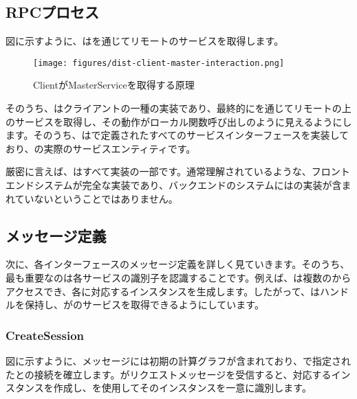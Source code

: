 \begin{content}
\subsection{RPCプロセス}

図に示すように、はを通じてリモートのサービスを取得します。

\begin{figure}[H]
\centering
\texttt{[image: figures/dist-client-master-interaction.png]}
\caption{ClientがMasterServiceを取得する原理}
 \label{fig:dist-client-master-interaction}
\end{figure}

そのうち、はクライアントの一種の実装であり、最終的にを通じてリモートの上のサービスを取得し、その動作がローカル関数呼び出しのように見えるようにします。そのうち、はで定義されたすべてのサービスインターフェースを実装しており、の実際のサービスエンティティです。

\begin{remark}
厳密に言えば、はすべて実装の一部です。通常理解されているような、フロントエンドシステムが完全な実装であり、バックエンドのシステムにはの実装が含まれていないということではありません。
\end{remark}

\subsection{メッセージ定義}

次に、各インターフェースのメッセージ定義を詳しく見ていきます。そのうち、最も重要なのは各サービスの識別子を認識することです。例えば、は複数のからアクセスでき、各に対応するインスタンスを生成します。したがって、はハンドルを保持し、がのサービスを取得できるようにしています。

\subsubsection{CreateSession}

図に示すように、メッセージには初期の計算グラフが含まれており、で指定されたとの接続を確立します。がリクエストメッセージを受信すると、対応するインスタンスを作成し、を使用してそのインスタンスを一意に識別します。


\end{content}
